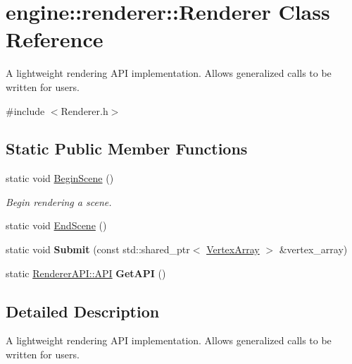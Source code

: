 \hypertarget{classengine_1_1renderer_1_1Renderer}{}\section{engine\+:\+:renderer\+:\+:Renderer Class Reference}
\label{classengine_1_1renderer_1_1Renderer}


A lightweight rendering A\+PI implementation. Allows generalized calls to be written for users.  




{\ttfamily \#include $<$Renderer.\+h$>$}

\subsection*{Static Public Member Functions}
\begin{DoxyCompactItemize}
\item 
\mbox{\label{classengine_1_1renderer_1_1Renderer_ab32ebce6334f6214f4f5d8ef13f1f267}} 
static void \hyperlink{classengine_1_1renderer_1_1Renderer_ab32ebce6334f6214f4f5d8ef13f1f267}{Begin\+Scene} ()
\begin{DoxyCompactList}\small\item\em Begin rendering a scene. \end{DoxyCompactList}\item 
static void \hyperlink{classengine_1_1renderer_1_1Renderer_aabecab3b2aea9d925bd7449c7f85539b}{End\+Scene} ()
\item 
\mbox{\label{classengine_1_1renderer_1_1Renderer_a84944c9f4686a36b2d35b48a39ce4b42}} 
static void {\bfseries Submit} (const std\+::shared\+\_\+ptr$<$ \hyperlink{classengine_1_1renderer_1_1VertexArray}{Vertex\+Array} $>$ \&vertex\+\_\+array)
\item 
\mbox{\label{classengine_1_1renderer_1_1Renderer_a61d12573cda993102d8e335f17380c8a}} 
static \hyperlink{classengine_1_1renderer_1_1RendererAPI_a624c2793dc8b315466c36332bbc82ef0}{Renderer\+A\+P\+I\+::\+A\+PI} {\bfseries Get\+A\+PI} ()
\end{DoxyCompactItemize}


\subsection{Detailed Description}
A lightweight rendering A\+PI implementation. Allows generalized calls to be written for users. 

